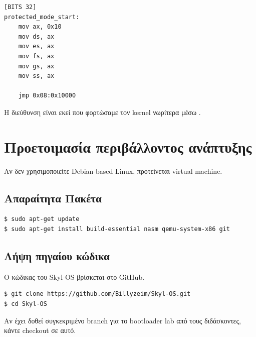 \documentclass[18pt]{extarticle}
\begin{document}
\begin{file}
\footnotesize \begin{lstlisting}[language={[x86masm]Assembler}, tabsize=2]
[BITS 32]
protected_mode_start:
    mov ax, 0x10
    mov ds, ax
    mov es, ax
    mov fs, ax
    mov gs, ax
    mov ss, ax

    jmp 0x08:0x10000
\end{lstlisting}
\end{file}

Η διεύθυνση  είναι εκεί που φορτώσαμε τον kernel νωρίτερα μέσω .


\section{Προετοιμασία περιβάλλοντος ανάπτυξης}

Αν δεν χρησιμοποιείτε Debian-based Linux, προτείνεται virtual machine.

\subsection{Απαραίτητα Πακέτα}

\begin{commandline}
\begin{verbatim}
$ sudo apt-get update
$ sudo apt-get install build-essential nasm qemu-system-x86 git
\end{verbatim}
\end{commandline}

\subsection{Λήψη πηγαίου κώδικα}

Ο κώδικας του Skyl-OS βρίσκεται στο GitHub.

\begin{commandline}
\begin{verbatim}
$ git clone https://github.com/Billyzeim/Skyl-OS.git
$ cd Skyl-OS
\end{verbatim}
\end{commandline}

\begin{info}[Σημείωση]
Αν έχει δοθεί συγκεκριμένο branch για το bootloader lab από τους διδάσκοντες, κάντε checkout σε αυτό.
\end{info}
\end{document}

